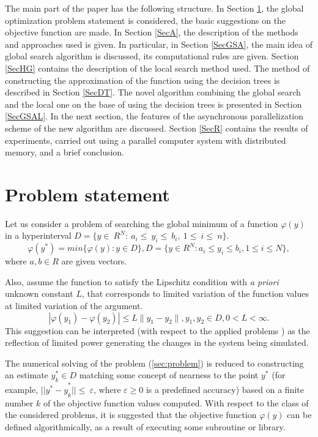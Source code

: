 \documentclass{svproc}
\begin{document}
The main part of the paper has the following structure.  In Section \ref{SecPS}, the global optimization problem statement is considered, the basic suggestions  on the objective function are made. In Section \ref{SecA}, the description of the methods and approaches used is given. In particular, in Section \ref{SecGSA},  the main idea of global search algorithm is discussed, its computational rules are given. Section \ref{SecHG} contains the description of the local search method used. The method of constructing the approximation of the function using the decision trees is described in  Section \ref{SecDT}. The novel algorithm combining the global search and the local one on the base of using the decision  trees is presented in Section \ref{SecGSAL}. In the next section,  the features of the asynchronous parallelization scheme of the new algorithm are discussed. Section \ref{SecR} contains the results of experiments, carried out using a parallel computer system  with distributed memory, and a brief conclusion.


\section{Problem statement}\label{SecPS}

Let us consider a problem of searching the global minimum of a function $\varphi(y)$ in a hyperinterval  $D=\{ y\in\ R^N:\ a_i\le\ y_i\le\ b_i,\ 1\le\ i\le\ n \}$. 
\begin{equation} \label{sec:problem}   
	\varphi(y^*) = min\{\varphi(y):y\in D\}, D = \{y \in R^N : a_i \leq y_i \leq b_i, 1 \leq i \leq N \},
\end{equation}
where $a,b \in R$ are given vectors.

Also, assume the function to satisfy the Lipschitz condition with \textit{a priori} unknown constant $L$, that corresponds to limited variation of the function values at limited variation of the argument.   
\begin{displaymath} 
	|\varphi(y_1)-\varphi(y_2)|\leq L\parallel y_1-y_2 \parallel ,y_1,y_2 \in D, 0<L< \infty. 
\end{displaymath}
This suggestion can be interpreted (with respect to the applied problems ) as the reflection of limited  power generating the changes in the system being simulated.

The numerical solving of the problem (\ref{sec:problem})  is reduced to constructing an estimate  $ y_k^\ast\in D$ matching some concept of nearness to the point $y^\ast$ (for example,  ${||y^\ast-y}_k^\ast||\le\ \varepsilon$, where $\varepsilon\geq0$ is a predefined accuracy) based on a  finite number $k$ of the objective function values computed. With respect to the class of the considered problems, it is suggested that the objective function $\varphi(y)$ can be defined algorithmically, as a result of executing some subroutine or library.
\end{document}
